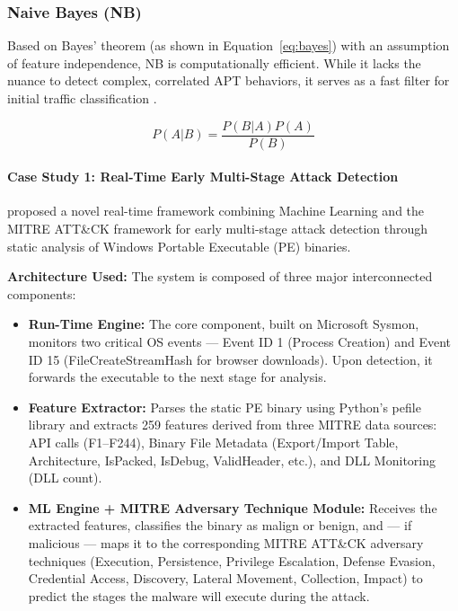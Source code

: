 \subsubsection{Naive Bayes (NB)}
Based on Bayes' theorem (as shown in Equation~\ref{eq:bayes}) with an assumption of feature independence, NB is computationally efficient. While it lacks the nuance to detect complex, correlated APT behaviors, it serves as a fast filter for initial traffic classification \cite{ankalaki2025cyber}.

\begin{equation}
    P(A|B) = \frac{P(B|A) P(A)}{P(B)}
    \label{eq:bayes}
\end{equation}

\paragraph{Case Study 1: Real-Time Early Multi-Stage Attack Detection \protect\cite{takey2021real}}
\cite{takey2021real} proposed a novel real-time framework combining Machine Learning and the MITRE ATT\&CK framework for early multi-stage attack detection through static analysis of Windows Portable Executable (PE) binaries.

\textbf{Architecture Used:} The system is composed of three major interconnected components:
\begin{itemize}
    \item \textbf{Run-Time Engine:} The core component, built on Microsoft Sysmon, monitors two critical OS events --- Event ID 1 (Process Creation) and Event ID 15 (FileCreateStreamHash for browser downloads). Upon detection, it forwards the executable to the next stage for analysis.
    \item \textbf{Feature Extractor:} Parses the static PE binary using Python's pefile library and extracts 259 features derived from three MITRE data sources: API calls (F1--F244), Binary File Metadata (Export/Import Table, Architecture, IsPacked, IsDebug, ValidHeader, etc.), and DLL Monitoring (DLL count).
    \item \textbf{ML Engine + MITRE Adversary Technique Module:} Receives the extracted features, classifies the binary as malign or benign, and --- if malicious --- maps it to the corresponding MITRE ATT\&CK adversary techniques (Execution, Persistence, Privilege Escalation, Defense Evasion, Credential Access, Discovery, Lateral Movement, Collection, Impact) to predict the stages the malware will execute during the attack.
\end{itemize}

